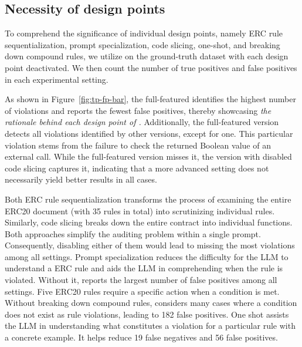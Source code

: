 \vspace{-0.1in}

\subsection{Necessity of \Tool{} design points}

To comprehend the significance of individual design points, 
namely ERC rule sequentialization, prompt specialization, 
code slicing, one-shot, and breaking down compound rules, 
we utilize \Tool{} on the ground-truth dataset with each design point deactivated. 
We then count the number of true positives and false positives 
in each experimental setting.


% 

As shown in Figure~\ref{fig:tp-fp-bar}, the full-featured \Tool{} identifies
the highest number of violations and reports the fewest false positives, 
thereby showcasing \emph{the rationale behind each design point of \Tool{}.} 
Additionally, the full-featured version detects all violations identified by other versions, 
except for one. This particular violation stems from the failure 
to check the returned Boolean value of an external call. 
While the full-featured version misses it, the version with disabled code 
slicing captures it, indicating that a more advanced setting does not necessarily yield better results in all cases.

Both ERC rule sequentialization transforms the process of examining 
the entire ERC20 document (with 35 rules in total) 
into scrutinizing individual rules. 
Similarly, code slicing breaks down the entire contract 
into individual functions. Both approaches simplify the auditing problem 
within a single prompt. Consequently, disabling either of them 
would lead to \Tool{} missing the most violations among all settings. 
%
Prompt specialization reduces the difficulty for the LLM to understand a ERC rule 
and aids the LLM in comprehending when the rule is violated. 
Without it, \Tool{} reports the largest number of false positives among all settings.
Five ERC20 rules require a specific action when a condition is 
met. Without breaking down compound rules, \Tool{} considers many cases where 
a condition does not exist as rule violations, leading to 182 false positives.
One shot assists the LLM in understanding what constitutes a violation for a particular rule with a concrete example. It helps reduce 19 false negatives and 56 false positives.




